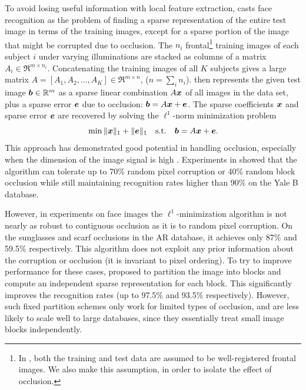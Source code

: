 To avoid losing useful information with local feature extraction,
\cite{Wright2009-PAMI} casts face recognition as the problem of finding a
sparse representation of the entire test image in terms of the training images,
except for a sparse portion of the image that might be corrupted due to
occlusion.  The $n_i$ frontal\footnote{In \cite{Wright2009-PAMI}, both the
training and test data are assumed to be well-registered frontal images. We
also make this assumption, in order to isolate the effect of occlusion.}
training images of each subject $i$ under varying illuminations are stacked as
columns of a matrix $A_i \in \Re^{m\times n_i}$. Concatenating the training
images of all $K$ subjects gives a large matrix $A = [A_1,A_2,\ldots,A_K] \in
\Re^{m\times n}$, ($n = \sum_i n_i$).  \cite{Wright2009-PAMI} then represents
the given test image $\boldsymbol{b} \in \mathbb R^m$ as a sparse linear combination $A {\boldsymbol{x}}$ of
all images in the data set, plus a sparse error $\boldsymbol{e}$ due to occlusion: $\boldsymbol{b} = A
{\boldsymbol{x}} + \boldsymbol{e}$. The sparse coefficients ${\boldsymbol{x}}$ and sparse error $\boldsymbol{e}$ are recovered by
solving the $\ell^1$-norm minimization problem
\begin{equation}
\min \|{\boldsymbol{x}}\|_1 + \|\boldsymbol{e}\|_1\quad \textup{s.t.} \quad \boldsymbol{b} = A {\boldsymbol{x}} + \boldsymbol{e}.
\end{equation}
This approach has demonstrated good potential in handling occlusion, especially
when the dimension of the image signal is high \cite{Wright2008-IT}.
Experiments in \cite{Wright2009-PAMI} showed that the algorithm can tolerate up
to 70\% random pixel corruption or 40\% random block occlusion while still
maintaining recognition rates higher than $90\%$ on the Yale B database.

However, in experiments on face images the $\ell^1$-minimization algorithm is
not nearly as robust to contiguous occlusion as it is to random pixel
corruption.  On the sunglasses and scarf occlusions in the AR database, it achieves
only 87\% and 59.5\% respectively.  This algorithm does not exploit any prior
information about the corruption or occlusion (it is invariant to pixel
ordering).  To try to improve performance for these cases,
\cite{Wright2009-PAMI} proposed to partition the image into blocks and compute
an independent sparse representation for each block. This significantly
improves the recognition rates (up to 97.5\% and 93.5\% respectively). However,
such fixed partition schemes only work for limited types of occlusion, and are
less likely to scale well to large databases, since they essentially treat
small image blocks independently.

